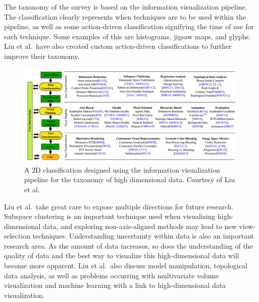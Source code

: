 The taxonomy of the survey is based on the information visualization pipeline. The classification clearly represents when techniques are to be used within the pipeline, as well as some action-driven classification signifying the time of use for each technique. Some examples of this are histograms, jigsaw maps, and glyphs. Liu et al.\ have also created custom action-driven classifications to further improve their taxonomy.

\begin{figure}[t]
\begin{center}
\includegraphics[width=1\textwidth]{images/liu2015visualising.png}
\caption{A 2D classification designed using the information visualization pipeline for the taxonomy of high dimensional data. Courtesy of Liu et al.\ \cite{liu2015visualising}} \label{fig: liu2015visualising}
\end{center}
\end{figure}

%
%
%

Liu et al.\ take great care to expose multiple directions for future research. Subspace clustering is an important technique used when visualizing high-dimensional data, and exploring non-axis-aligned methods may lead to new view-selection techniques. Understanding uncertainty within data is also an important research area. As the amount of data increases, so does the understanding of the quality of data and the best way to visualize this high-dimensional data will become more apparent. Liu et al.\ also discuss model manipulation, topological data analysis, as well as problems occurring with multivariate volume visualization and machine learning with a link to high-dimensional data visualization.

